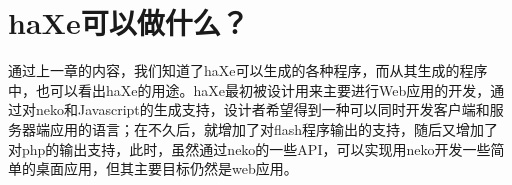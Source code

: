 \section{haXe可以做什么？}

通过上一章的内容，我们知道了haXe可以生成的各种程序，而从其生成的程序中，也可以看出haXe的用途。haXe最初被设计用来主要进行Web应用的开发，通过对neko和Javascript的生成支持，设计者希望得到一种可以同时开发客户端和服务器端应用的语言；在不久后，就增加了对flash程序输出的支持，随后又增加了对php的输出支持，此时，虽然通过neko的一些API，可以实现用neko开发一些简单的桌面应用，但其主要目标仍然是web应用。
